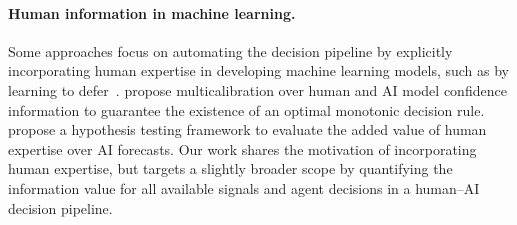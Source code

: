 \mvspace{-3mm}
\paragraph{Human information in machine learning.}

Some approaches focus on automating the decision pipeline by explicitly incorporating human expertise in developing machine learning models, such as by learning to defer~\citep{mozannar2024show, madras2018predict, raghu2019algorithmic, keswani2022designing, keswani2021towards, okati2021differentiable}.
\citet{corvelo2023human} propose multicalibration over human and AI model confidence information to guarantee the existence of an optimal monotonic decision rule.
\citet{alur2023auditing} propose a hypothesis testing framework to evaluate the added value of human expertise over AI forecasts.
Our work shares the motivation of incorporating human expertise, but targets a slightly broader scope by quantifying the information value for all available signals and agent decisions in a human–AI decision pipeline.

